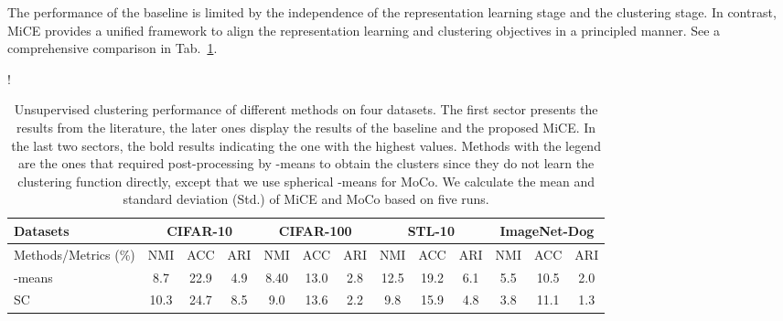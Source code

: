\documentclass{article} \usepackage{iclr2021_conference,times}
\begin{document}
The performance of the baseline is limited by the independence of the representation learning stage and the clustering stage. In contrast, MiCE provides a unified framework to align the representation learning and clustering objectives in a principled manner. See a comprehensive comparison in Tab.~\ref{tab:fullexp}.























\begin{table}[]
\centering
\caption{Unsupervised clustering performance of different methods on four datasets. The first sector presents the results from the literature, the later ones display the results of the baseline and the proposed MiCE. In the last two sectors, the bold results indicating the one with the highest values. Methods with the legend\textdagger{} are the ones that required post-processing by -means to obtain the clusters since they do not learn the clustering function directly, except that we use spherical -means for MoCo. We calculate the mean and standard deviation (Std.) of MiCE and MoCo based on five runs.}
\label{tab:fullexp}
\resizebox{1.0\columnwidth}!{
\setlength{\tabcolsep}{1.0mm}
{
\begin{tabular}{@{}lccc|ccc|ccc|ccc@{}}
\toprule
Datasets               & \multicolumn{3}{c}{CIFAR-10}                  & \multicolumn{3}{c}{CIFAR-100}              & \multicolumn{3}{c}{STL-10}                    & \multicolumn{3}{c}{ImageNet-Dog} \\ \midrule
Methods/Metrics (\%)        & NMI           & ACC           & ARI           & NMI           & ACC           & ARI           & NMI           & ACC           & ARI           & NMI       & ACC       & ARI      \\ \hline -means~\citep{lloyd1982least}              & 8.7           & 22.9          & 4.9           & 8.40          & 13.0          & 2.8           & 12.5          & 19.2          & 6.1           & 5.5       & 10.5      & 2.0      \\
SC~\citep{zelnikmanor2004self-tuning}                     & 10.3          & 24.7          & 8.5           & 9.0           & 13.6          & 2.2           & 9.8           & 15.9          & 4.8           & 3.8       & 11.1      & 1.3      \\

\end{tabular}}}
\end{table}
\end{document}
